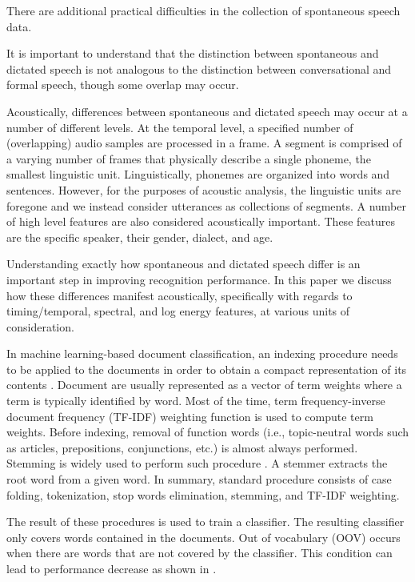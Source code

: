 \documentclass[conference]{IEEEtran}
\begin{document}
There are additional practical difficulties in the collection of spontaneous speech data. 

It is important to understand that the distinction between spontaneous and dictated speech is not analogous to the distinction between conversational and formal speech, though some overlap may occur. 

Acoustically, differences between spontaneous and dictated speech may occur at a number of different levels.
At the temporal level, a specified number of (overlapping) audio samples are processed in a frame.
A segment is comprised of a varying number of frames that physically describe a single phoneme, the smallest linguistic unit.
Linguistically, phonemes are organized into words and sentences.
However, for the purposes of acoustic analysis, the linguistic units are foregone and we instead consider utterances as collections of segments.
A number of high level features are also considered acoustically important.
These features are the specific speaker, their gender, dialect, and age.

Understanding exactly how spontaneous and dictated speech differ is an important step in improving recognition performance. In this paper we discuss how these differences manifest acoustically, specifically with regards to timing/temporal, spectral, and log energy features, at various units of consideration.

In machine learning-based document classification, an indexing procedure needs to be applied to the documents in order to obtain a compact representation of its contents \cite{sebastiani}.
Document are usually represented as a vector of term weights where a term is typically identified by word.
Most of the time, term frequency-inverse document frequency (TF-IDF) weighting function is used to compute term weights.
Before indexing, removal of function words (i.e., topic-neutral words such as articles, prepositions, conjunctions, etc.) is almost always performed.
Stemming is widely used to perform such procedure \cite{ayu}.
A stemmer extracts the root word from a given word.
In summary, standard procedure consists of case folding, tokenization, stop words elimination, stemming, and TF-IDF weighting.

The result of these procedures is used to train a classifier.
The resulting classifier only covers words contained in the documents.
Out of vocabulary (OOV) occurs when there are words that are not covered by the classifier.
This condition can lead to performance decrease as shown in \cite{rahma}.
\end{document}
